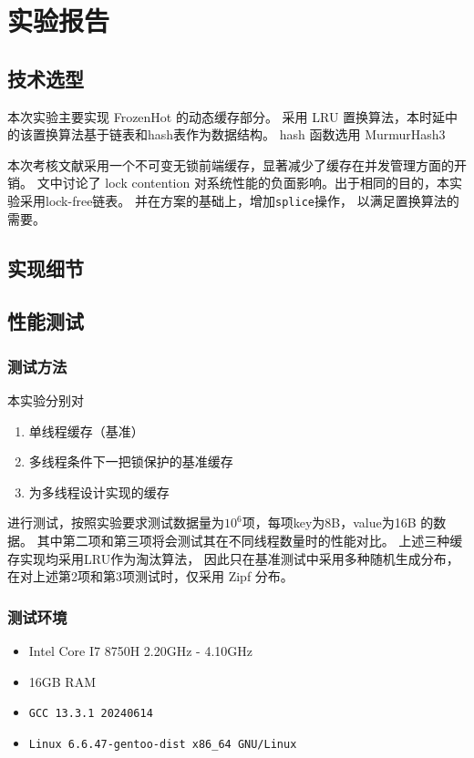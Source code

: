 \maketitle

\section{实验报告}

\subsection{技术选型}

本次实验主要实现 FrozenHot\cite{qiu_frozenhot_2023} 的动态缓存部分。
采用 LRU 置换算法，本时延中的该置换算法基于链表和hash表作为数据结构。
hash 函数选用 MurmurHash3 \cite{SMHasher}

本次考核文献\cite{qiu_frozenhot_2023}采用一个不可变无锁前端缓存，显著减少了缓存在并发管理方面的开销。
文中讨论了 lock contention 对系统性能的负面影响。出于相同的目的，本实验采用lock-free链表。
并在\cite{timothy_l_harris_pragmatic_2001}方案的基础上，增加\verb|splice|操作，
以满足置换算法的需要。

\subsection{实现细节}


\subsection{性能测试}

\subsubsection{测试方法}

本实验分别对
\begin{enumerate}
    \item 单线程缓存（基准）
    \item 多线程条件下一把锁保护的基准缓存
    \item 为多线程设计实现的缓存
\end{enumerate}
进行测试，按照实验要求测试数据量为$10^6$项，每项key为8B，value为16B 的数据。
其中第二项和第三项将会测试其在不同线程数量时的性能对比。
上述三种缓存实现均采用LRU作为淘汰算法，
因此只在基准测试中采用多种随机生成分布，
在对上述第2项和第3项测试时，仅采用 Zipf 分布\cite{dirtyzipf2024}。

\subsubsection{测试环境}

\begin{itemize}
    \item Intel Core I7 8750H 2.20GHz - 4.10GHz
    \item 16GB RAM
    \item \verb|GCC 13.3.1 20240614|
    \item \verb|Linux 6.6.47-gentoo-dist x86_64 GNU/Linux|
\end{itemize}
